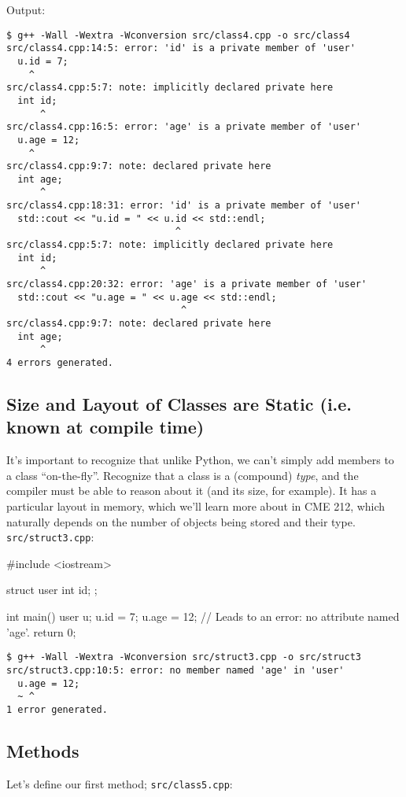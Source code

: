 \documentclass[12pt,letterpaper,twoside]{article}
\begin{document}
Output:

\begin{verbatim}
$ g++ -Wall -Wextra -Wconversion src/class4.cpp -o src/class4
src/class4.cpp:14:5: error: 'id' is a private member of 'user'
  u.id = 7;
    ^
src/class4.cpp:5:7: note: implicitly declared private here
  int id;
      ^
src/class4.cpp:16:5: error: 'age' is a private member of 'user'
  u.age = 12;
    ^
src/class4.cpp:9:7: note: declared private here
  int age;
      ^
src/class4.cpp:18:31: error: 'id' is a private member of 'user'
  std::cout << "u.id = " << u.id << std::endl;
                              ^
src/class4.cpp:5:7: note: implicitly declared private here
  int id;
      ^
src/class4.cpp:20:32: error: 'age' is a private member of 'user'
  std::cout << "u.age = " << u.age << std::endl;
                               ^
src/class4.cpp:9:7: note: declared private here
  int age;
      ^
4 errors generated.
\end{verbatim}

\subsection{Size and Layout of Classes are Static ({\small i.e. known at compile time})}
It's important to recognize that unlike Python, we can't simply add members to
a class ``on-the-fly''. Recognize that a class is a (compound) \emph{type}, and
the compiler must be able to reason about it (and its size, for example). 
It has a particular layout in memory, which we'll learn more about in 
CME 212, which naturally depends on the number of objects being stored and 
their type.
\texttt{src/struct3.cpp}:

\begin{cpp}
#include <iostream>

struct user { int id; };

int main() {
  user u;
  u.id = 7;
  u.age = 12;   // Leads to an error: no attribute named 'age'.
  return 0;
}
\end{cpp}

\begin{verbatim}
$ g++ -Wall -Wextra -Wconversion src/struct3.cpp -o src/struct3
src/struct3.cpp:10:5: error: no member named 'age' in 'user'
  u.age = 12;
  ~ ^
1 error generated.
\end{verbatim}

\subsection{Methods}
Let's define our first method; \texttt{src/class5.cpp}:
\end{document}
